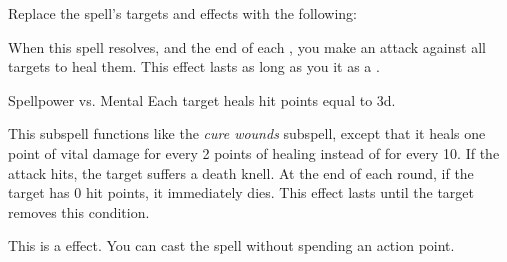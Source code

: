 Replace the spell's targets and effects with the following:
\begin{spellcontent}
\begin{augmenttargetinginfo}
\end{augmenttargetinginfo}
\begin{augmenteffects}
\spelleffect
When this spell resolves, and the end of each , you make an attack against all targets to heal them.
This effect lasts as long as you  it as a .
\begin{spellattack}{Spellpower vs. Mental}
\spellsuccess
Each target heals hit points equal to  \minus3d.
\end{spellattack}
\end{augmenteffects}
\end{spellcontent}
This subspell functions like the \textit{cure wounds} subspell, except that it heals one point of vital damage for every 2 points of healing instead of for every 10.
If the attack hits, the target suffers a death knell.
At the end of each round, if the target has 0 hit points, it immediately dies.
This effect lasts until the target removes this condition.
\par
This is a  effect.
You can cast the spell without spending an action point.